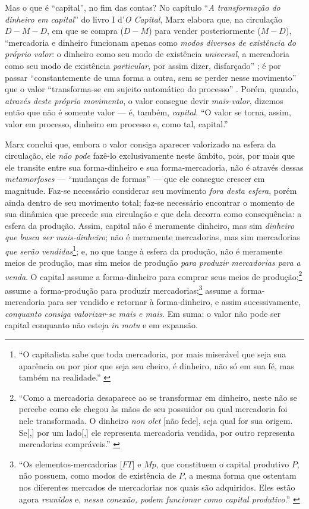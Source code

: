 Mas o que é ``capital'', no fim das contas? No capítulo ``\emph{A transformação do dinheiro em capital}'' do livro I d'\emph{O Capital}, Marx elabora que, na circulação $D-M-D$, em que se compra ($D-M$) para vender posteriormente ($M-D$), ``mercadoria e dinheiro funcionam apenas como \emph{modos diversos de existência do próprio valor}: o dinheiro como seu modo de existência \emph{universal}, a mercadoria como seu modo de existência \emph{particular}, por assim dizer, disfarçado'' \parencite[p. 229, grifo meu]{Marx2017}; é por passar ``constantemente de uma forma a outra, sem se perder nesse movimento'' que o valor ``transforma-se em sujeito automático do processo'' \parencite[p.229-30]{Marx2017}. Porém, quando, \emph{através deste próprio movimento}, o valor consegue devir \emph{mais-valor}, dizemos então que não é somente valor --- é, também, \emph{capital}. ``O valor se torna, assim, valor em processo, dinheiro em processo e, como tal, capital.'' \parencite[p. 231]{Marx2017}

Marx conclui que, embora o valor consiga aparecer valorizado na esfera da circulação, ele \emph{não pode} fazê-lo exclusivamente neste âmbito, pois, por mais que ele transite entre sua forma-dinheiro e sua forma-mercadoria, não é através dessas \textit{metamorfoses} --- ``mudanças de formas'' --- que ele consegue crescer em magnitude. Faz-se necessário considerar seu movimento \emph{fora desta esfera}, porém ainda dentro de seu movimento total; faz-se necessário encontrar o momento de sua dinâmica que precede sua circulação e que dela decorra como consequência: a esfera da produção. Assim, capital não é meramente dinheiro, mas sim \emph{dinheiro que busca ser mais-dinheiro}; não é meramente mercadorias, mas sim mercadorias \emph{que serão vendidas}\footnote{``O capitalista sabe que toda mercadoria, por mais miserável que seja sua aparência ou por pior que seja seu cheiro, é dinheiro, não só em sua fé, mas também na realidade.'' \parencite[p. 230]{Marx2017}}; e, no que tange à esfera da produção, não é meramente meios de produção, mas sim meios de produção \emph{para produzir mercadorias para a venda}. O capital assume a forma-dinheiro para comprar seus meios de produção;\footnote{``Como a mercadoria desaparece ao se transformar em dinheiro, neste não se percebe como ele chegou às mãos de seu possuidor ou qual mercadoria foi nele transformada. O dinheiro \emph{non olet} {[}não fede{]}, seja qual for sua origem. Se{[},{]} por um lado{[},{]} ele representa mercadoria vendida, por outro representa mercadorias compráveis.'' \parencite[p. 184]{Marx2017}} assume a forma-produção para produzir mercadorias;\footnote{``Os elementos-mercadorias {[}$FT${]} e $Mp$, que constituem o capital produtivo $P$, não possuem, como modos de existência de $P$, a mesma forma que ostentam nos diferentes mercados de mercadorias nos quais são adquiridos. Eles estão agora \emph{reunidos} e, \emph{nessa conexão, podem funcionar como capital produtivo}.'' \parencite[p. 174; grifo meu]{Marx2014}} assume a forma-mercadoria para ser vendido e retornar à forma-dinheiro, e assim sucessivamente, \emph{conquanto consiga valorizar-se mais e mais}. Em suma: o valor não pode ser capital conquanto não esteja \emph{in motu} e em expansão.

